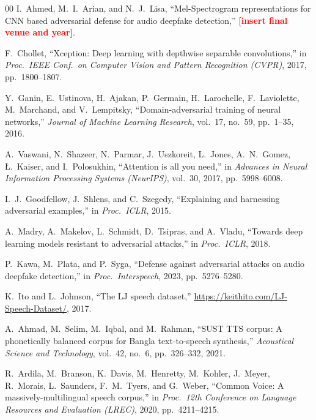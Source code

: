 \documentclass[conference]{IEEEtran}
\newcommand{\FILL}[1]{\textcolor{red}{\textbf{[#1]}}}
\begin{document}
\begin{thebibliography}{00}
I.~Ahmed, M.~I.~Arian, and N.~J.~Lisa, ``Mel-Spectrogram representations for
CNN based adversarial defense for audio deepfake detection,''
\FILL{insert final venue and year}.

F.~Chollet, ``Xception: Deep learning with depthwise separable convolutions,''
in \emph{Proc.\ IEEE Conf.\ on Computer Vision and Pattern Recognition
(CVPR)}, 2017, pp.~1800--1807.

Y.~Ganin, E.~Ustinova, H.~Ajakan, P.~Germain, H.~Larochelle, F.~Laviolette,
M.~Marchand, and V.~Lempitsky, ``Domain-adversarial training of neural
networks,'' \emph{Journal of Machine Learning Research}, vol.~17, no.~59,
pp.~1--35, 2016.

A.~Vaswani, N.~Shazeer, N.~Parmar, J.~Uszkoreit, L.~Jones, A.~N.~Gomez,
{\L}.~Kaiser, and I.~Polosukhin, ``Attention is all you need,'' in
\emph{Advances in Neural Information Processing Systems (NeurIPS)}, vol.~30,
2017, pp.~5998--6008.

I.~J.~Goodfellow, J.~Shlens, and C.~Szegedy, ``Explaining and harnessing
adversarial examples,'' in \emph{Proc.\ ICLR}, 2015.

A.~Madry, A.~Makelov, L.~Schmidt, D.~Tsipras, and A.~Vladu, ``Towards deep
learning models resistant to adversarial attacks,'' in \emph{Proc.\ ICLR},
2018.

P.~Kawa, M.~Plata, and P.~Syga, ``Defense against adversarial attacks on audio
deepfake detection,'' in \emph{Proc.\ Interspeech}, 2023, pp.~5276--5280.

K.~Ito and L.~Johnson, ``The LJ speech dataset,''
\url{https://keithito.com/LJ-Speech-Dataset/}, 2017.

A.~Ahmad, M.~Selim, M.~Iqbal, and M.~Rahman, ``SUST TTS corpus: A
phonetically balanced corpus for Bangla text-to-speech synthesis,''
\emph{Acoustical Science and Technology}, vol.~42, no.~6, pp.~326--332, 2021.

R.~Ardila, M.~Branson, K.~Davis, M.~Henretty, M.~Kohler, J.~Meyer, R.~Morais,
L.~Saunders, F.~M.~Tyers, and G.~Weber, ``Common Voice: A
massively-multilingual speech corpus,'' in \emph{Proc.\ 12th Conference on
Language Resources and Evaluation (LREC)}, 2020, pp.~4211--4215.

\end{thebibliography}
\fi
\end{document}
